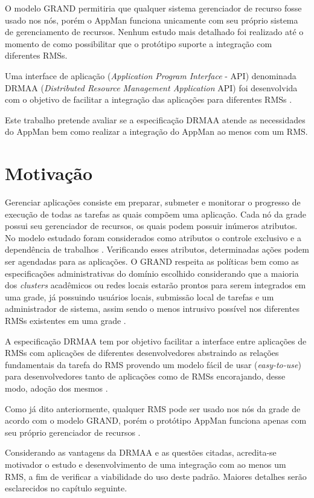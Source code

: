 O modelo GRAND permitiria que qualquer sistema gerenciador de recurso fosse usado nos nós, porém o AppMan funciona unicamente com seu próprio sistema de gerenciamento de recursos. Nenhum estudo mais detalhado foi realizado até o momento de como possibilitar que o protótipo suporte a integração com diferentes RMSs.

Uma interface de aplicação (\emph{Application Program Interface} - API) denominada DRMAA (\emph{Distributed Resource Management Application} API) foi desenvolvida com o objetivo de facilitar a integração das aplicações para diferentes RMSs \cite{Rajic2004}.

Este trabalho pretende avaliar se a especificação DRMAA atende as necessidades do AppMan bem como realizar a integração do AppMan ao menos com um RMS.

\section{Motivação}
Gerenciar aplicações consiste em preparar, submeter e monitorar o progresso de execução de todas as tarefas as quais compõem uma aplicação. Cada nó da grade possui seu gerenciador de recursos, os quais podem possuir inúmeros atributos. No modelo estudado foram considerados como atributos o controle exclusivo e a dependência de trabalhos \cite{Mangan2006}. Verificando esses atributos, determinadas ações podem ser agendadas para as aplicações. O GRAND respeita as políticas bem como as especificações administrativas do domínio escolhido considerando que a maioria dos \emph{clusters} acadêmicos ou redes locais estarão prontos para serem integrados em uma grade, já possuindo usuários locais, submissão local de tarefas e um administrador de sistema, assim sendo o menos intrusivo possível nos diferentes RMSs existentes em uma grade \cite{Mangan2006}.

A especificação DRMAA tem por objetivo facilitar a interface entre aplicações de RMSs com aplicações de diferentes desenvolvedores abstraindo as relações fundamentais da tarefa do RMS provendo um modelo fácil de usar (\emph{easy-to-use}) para desenvolvedores tanto de aplicações como de RMSs encorajando, desse modo, adoção dos mesmos \cite{Rajic2004}.

Como já dito anteriormente, qualquer RMS pode ser usado nos nós da grade de acordo com o modelo GRAND, porém o protótipo AppMan funciona apenas com seu próprio gerenciador de recursos \cite{Mangan2006}.

Considerando as vantagens da DRMAA \cite{Troeger2007} e as questões citadas, acredita-se motivador o estudo e desenvolvimento de uma integração com ao menos um RMS, a fim de verificar a viabilidade do uso deste padrão. Maiores detalhes serão esclarecidos no capítulo seguinte.

